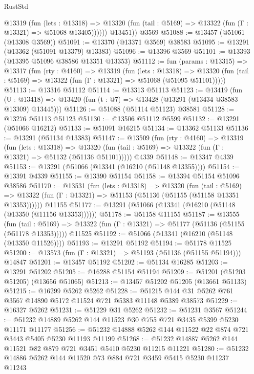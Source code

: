 \begin{lexlean}{RustStd}
\begin{coremodule}
            @13319
              (fun (lets : @13318) =>
              @13320 (fun (tail : @5169) => @13322 (fun (Γ : @13321) => @51068 @13405))))))
        @13451))
    @3569
@51088 := @13457 (@51061 (@13308 @3569))
@51091 := @13370 (@13371 @3569) @38583
@51095 := @13291 (@13362 (@51091 @13379) @13383)
@51096 := @13396 @3569
@51101 := @13393 (@13395 @51096 @38586 @13351 @13353)
@51112 := fun (params : @13315) =>
  @13317
    (fun (rty : @4160) =>
    @13319
      (fun (lets : @13318) =>
      @13320 (fun (tail : @5169) => @13322 (fun (Γ : @13321) => @51068 (@51095 @51101)))))
@51113 := @13316 @51112
@51114 := @13313 @51113
@51123 := @13419
    (fun (U : @13418) => @13420 (fun (t : @7) => @13428 (@13291 (@13434 @38583 @13309) @13445)))
@51126 := @51088 (@51114 @51123) @38581
@51128 := @13276 @51113 @51123
@51130 := @13506 @51112 @5599
@51132 := @13291 (@51066 @16212)
@51133 := @51091 @16215
@51134 := @13362 @51133
@51136 := @13291 (@51134 @13383)
@51147 := @13509
    (fun (rty : @4160) =>
    @13319
      (fun (lets : @13318) =>
      @13320 (fun (tail : @5169) => @13322 (fun (Γ : @13321) => @51132 (@51136 @51101)))))
    @4339
@51148 := @13347 @4339
@51153 := @13291 (@51066 (@13341 (@16210 (@51148 @13355))))
@51154 := @13391 @4339
@51155 := @13390 @51154
@51158 := @13394 @51154 @51096 @38586
@51170 := @13531
    (fun (lets : @13318) =>
    @13320
      (fun (tail : @5169) =>
      @13322 (fun (Γ : @13321) => @51153 (@51136 (@51155 (@51158 @13351 @13353))))))
    @11155
@51177 := @13291 (@51066 (@13341 (@16210 (@51148 (@13350 (@11156 @13353))))))
@51178 := @51158 @11155
@51187 := @13555
    (fun (tail : @5169) => @13322 (fun (Γ : @13321) => @51177 (@51136 (@51155 (@51178 @13353)))))
    @11525
@51192 := @51066 (@13341 (@16210 (@51148 (@13350 @11526))))
@51193 := @13291 @51192
@51194 := @51178 @11525
@51200 := @13573 (fun (Γ : @13321) => @51193 (@51136 (@51155 @51194))) @14847
@51201 := @13457 @51192
@51202 := @51134 @16285
@51203 := @13291 @51202
@51205 := @16288 @51154 @51194
@51209 := @51201 (@51203 @51205) (@13656 @51065)
@51213 := @13457 @51202 @51205 (@13661 @51133)
@51215 := @16299 @5262 @5262
@51228 := @51215 @144 @31 @5262 @761 @3567 @14890 @5172 @11524 @721 @5383 @11148 @5389 @38573
@51229 := @16327 @5262
@51231 := @51229 @31 @5262
@51232 := @51231 @3567
@51244 := @51232 @14889 @5262 @144 @11523 @30 @755 @721 @3435 @5399 @5230 @11171 @11177
@51256 := @51232 @14888 @5262 @144 @11522 @22 @874 @721 @3443 @5405 @5230 @11193 @11199
@51268 := @51232 @14887 @5262 @144 @11521 @82 @879 @721 @3451 @5410 @5230 @11215 @11221
@51280 := @51232 @14886 @5262 @144 @11520 @73 @884 @721 @3459 @5415 @5230 @11237 @11243

\end{coremodule}
\end{lexlean}
